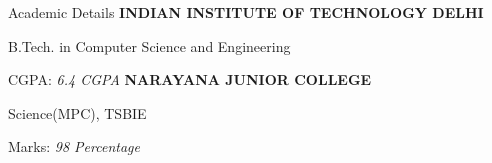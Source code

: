 \begin{rubric}{Academic Details}
%
	\textbf{INDIAN INSTITUTE OF TECHNOLOGY DELHI}\par
    B.Tech. in Computer Science and Engineering
    \par CGPA: \textit{ 6.4 CGPA}
%
%
\entry*[2019 -- 2021]%
	\textbf{NARAYANA JUNIOR COLLEGE} \par
    Science(MPC), TSBIE
    \par Marks: \textit{ 98 Percentage}
%
\end{rubric}
